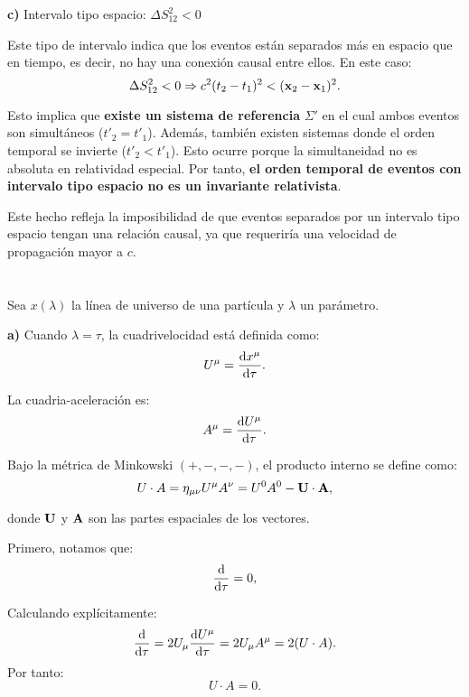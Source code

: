\documentclass{article}
\begin{document}
\textbf{c)} Intervalo tipo espacio: $\Delta S_{12}^2 < 0$

Este tipo de intervalo indica que los eventos están separados más en espacio que en tiempo, es decir, no hay una conexión causal entre ellos. En este caso:
\[
\Delta S_{12}^2 < 0 \Rightarrow c^2(t_2 - t_1)^2 < (\vb{x}_2 - \vb{x}_1)^2.
\]

Esto implica que \textbf{existe un sistema de referencia} $\Sigma'$ en el cual ambos eventos son simultáneos ($t'_2 = t'_1$). Además, también existen sistemas donde el orden temporal se invierte ($t'_2 < t'_1$). Esto ocurre porque la simultaneidad no es absoluta en relatividad especial. Por tanto, \textbf{el orden temporal de eventos con intervalo tipo espacio no es un invariante relativista}.

Este hecho refleja la imposibilidad de que eventos separados por un intervalo tipo espacio tengan una relación causal, ya que requeriría una velocidad de propagación mayor a $c$.


\section{}
Sea $x(\lambda)$ la línea de universo de una partícula y $\lambda$ un parámetro.


\textbf{a) } Cuando $\lambda = \tau$, la cuadrivelocidad está definida como:
\[
U^\mu = \dv{x^\mu}{\tau}.
\]

La cuadria-aceleración es:
\[
A^\mu = \dv{U^\mu}{\tau}.
\]

Bajo la métrica de Minkowski $(+,-,-,-)$, el producto interno se define como:
\[
U \cdot A = \eta_{\mu\nu} U^\mu A^\nu = U^0 A^0 - \vb{U} \cdot \vb{A},
\]

donde $\vb{U}$ y $\vb{A}$ son las partes espaciales de los vectores.

Primero, notamos que:
\[
\dv{}{ \tau } (U^\mu U_\mu) = 0,
\]

Calculando explícitamente:
\[
\dv{}{ \tau } (U^\mu U_\mu) = 2 U_\mu \dv{U^\mu}{\tau} = 2 U_\mu A^\mu = 2 (U \cdot A).
\]
Por tanto:
\[
U \cdot A = 0.
\]
\end{document}
